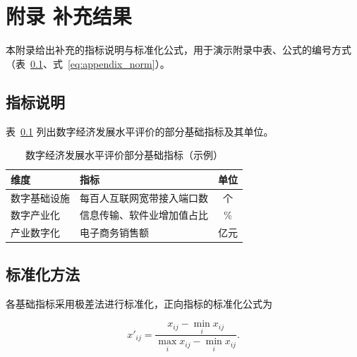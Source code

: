 \clearpage
{}
{}
\chapter*{附录 \thechapter\hspace{1em}补充结果}
\label{chap:appendix}

本附录给出补充的指标说明与标准化公式，用于演示附录中表、公式的编号方式（表~\ref{tab:appendix_indicators}、式~\eqref{eq:appendix_norm}）。

\section{指标说明}

表~\ref{tab:appendix_indicators} 列出数字经济发展水平评价的部分基础指标及其单位。

\begin{table}[!htbp]
    \centering
    \caption{数字经济发展水平评价部分基础指标（示例）}
    \label{tab:appendix_indicators}
    \wuhao\songti
    \begin{tabular}{llc}
        \toprule
        维度 & 指标 & 单位 \\
        \midrule
        数字基础设施 & 每百人互联网宽带接入端口数 & 个 \\
        数字产业化   & 信息传输、软件业增加值占比 & \% \\
        产业数字化   & 电子商务销售额 & 亿元 \\
        \bottomrule
    \end{tabular}

\end{table}

\section{标准化方法}

各基础指标采用极差法进行标准化，正向指标的标准化公式为

\begin{equation}
    x'_{ij} = \frac{x_{ij}-\min_i x_{ij}}{\max_i x_{ij}-\min_i x_{ij}}.
    \label{eq:appendix_norm}
\end{equation}
